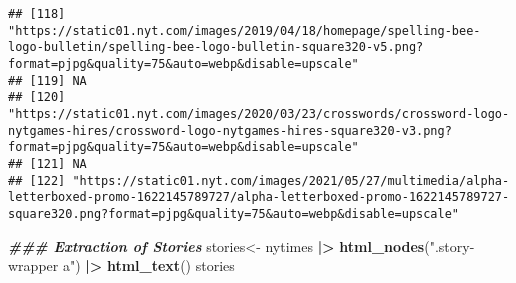 \documentclass[
]{article}
\newenvironment{Shaded}{\begin{snugshade}}{\end{snugshade}}
\newcommand{\DocumentationTok}[1]{\textcolor[rgb]{0.56,0.35,0.01}{\textbf{\textit{#1}}}}
\newcommand{\FunctionTok}[1]{\textcolor[rgb]{0.13,0.29,0.53}{\textbf{#1}}}
\newcommand{\NormalTok}[1]{#1}
\newcommand{\OtherTok}[1]{\textcolor[rgb]{0.56,0.35,0.01}{#1}}
\newcommand{\SpecialCharTok}[1]{\textcolor[rgb]{0.81,0.36,0.00}{\textbf{#1}}}
\newcommand{\StringTok}[1]{\textcolor[rgb]{0.31,0.60,0.02}{#1}}
\begin{document}
\begin{verbatim}
## [118] "https://static01.nyt.com/images/2019/04/18/homepage/spelling-bee-logo-bulletin/spelling-bee-logo-bulletin-square320-v5.png?format=pjpg&quality=75&auto=webp&disable=upscale"                         
## [119] NA                                                                                                                                                                                                    
## [120] "https://static01.nyt.com/images/2020/03/23/crosswords/crossword-logo-nytgames-hires/crossword-logo-nytgames-hires-square320-v3.png?format=pjpg&quality=75&auto=webp&disable=upscale"                 
## [121] NA                                                                                                                                                                                                    
## [122] "https://static01.nyt.com/images/2021/05/27/multimedia/alpha-letterboxed-promo-1622145789727/alpha-letterboxed-promo-1622145789727-square320.png?format=pjpg&quality=75&auto=webp&disable=upscale"
\end{verbatim}

\begin{Shaded}
\begin{Highlighting}[]
\DocumentationTok{\#\#\# Extraction of Stories }
\NormalTok{stories}\OtherTok{\textless{}{-}}\NormalTok{ nytimes }\SpecialCharTok{|\textgreater{}} \FunctionTok{html\_nodes}\NormalTok{(}\StringTok{".story{-}wrapper a"}\NormalTok{) }\SpecialCharTok{|\textgreater{}} \FunctionTok{html\_text}\NormalTok{()}
\NormalTok{stories}
\end{Highlighting}
\end{Shaded}
\end{document}
